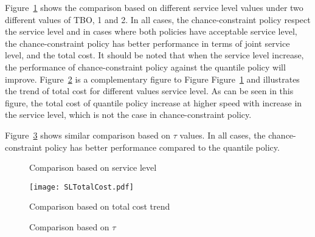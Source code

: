\documentclass[10pt]{article}
\begin{document}
Figure~\ref{fig:SLComp} shows the comparison based on different service level values under two different values of TBO, 1 and 2. In all cases, the chance-constraint policy respect the service level and in cases where both policies have acceptable service level, the chance-constraint policy has better performance in terms of joint service level, and the total cost. It should be noted that when the service level increase, the performance of chance-constraint policy against the quantile policy will improve. Figure~\ref{fig:SLTotalCost} is a complementary figure to Figure Figure~\ref{fig:SLComp} and illustrates the trend of total cost for different values service level. As can be seen in this figure, the total cost of quantile policy increase at higher speed with increase in the service level, which is not the case in chance-constraint policy.

Figure~\ref{fig:TIComp} shows similar comparison based on $\tau$ values. In all cases, the chance-constraint policy has better performance compared to the quantile policy.

\begin{figure}%
    \centering
    \caption{Comparison based on service level}%
    \label{fig:SLComp}%
\end{figure}

\begin{figure}[!h]
\begin{center}
\texttt{[image: SLTotalCost.pdf]}
\caption{Comparison based on total cost trend} 
\label{fig:SLTotalCost}
\end{center}
\end{figure}


\begin{figure}%
    \centering
    \caption{Comparison based on $\tau$}%
    \label{fig:TIComp}%
\end{figure}
\end{document}
